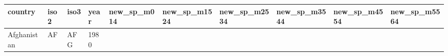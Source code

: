 \documentclass[]{article}
\begin{document}
\begin{longtable}[]{@{}llllllllll@{}}
\toprule
\begin{minipage}[b]{0.08\columnwidth}\raggedright\strut
country\strut
\end{minipage} & \begin{minipage}[b]{0.04\columnwidth}\raggedright\strut
iso2\strut
\end{minipage} & \begin{minipage}[b]{0.04\columnwidth}\raggedright\strut
iso3\strut
\end{minipage} & \begin{minipage}[b]{0.04\columnwidth}\raggedright\strut
year\strut
\end{minipage} & \begin{minipage}[b]{0.08\columnwidth}\raggedright\strut
new\_sp\_m014\strut
\end{minipage} & \begin{minipage}[b]{0.09\columnwidth}\raggedright\strut
new\_sp\_m1524\strut
\end{minipage} & \begin{minipage}[b]{0.09\columnwidth}\raggedright\strut
new\_sp\_m2534\strut
\end{minipage} & \begin{minipage}[b]{0.09\columnwidth}\raggedright\strut
new\_sp\_m3544\strut
\end{minipage} & \begin{minipage}[b]{0.09\columnwidth}\raggedright\strut
new\_sp\_m4554\strut
\end{minipage} & \begin{minipage}[b]{0.09\columnwidth}\raggedright\strut
new\_sp\_m5564\strut
\end{minipage}\tabularnewline
\midrule
\endhead
\begin{minipage}[t]{0.08\columnwidth}\raggedright\strut
Afghanistan\strut
\end{minipage} & \begin{minipage}[t]{0.04\columnwidth}\raggedright\strut
AF\strut
\end{minipage} & \begin{minipage}[t]{0.04\columnwidth}\raggedright\strut
AFG\strut
\end{minipage} & \begin{minipage}[t]{0.04\columnwidth}\raggedright\strut
1980\strut
\end{minipage} & \begin{minipage}[t]{0.08\columnwidth}\raggedright\strut
\strut
\end{minipage} & \begin{minipage}[t]{0.09\columnwidth}\raggedright\strut

\end{minipage}
\end{longtable}
\end{document}
